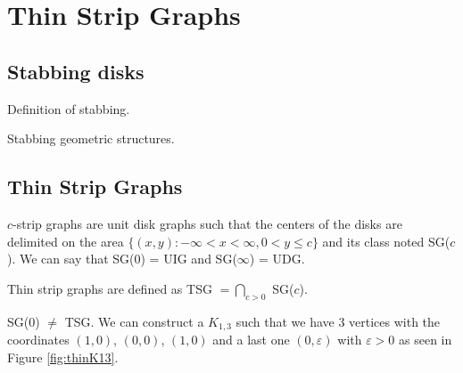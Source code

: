 
\section{Thin Strip Graphs}

\subsection{Stabbing disks}

Definition of stabbing.

Stabbing geometric structures.\cite{schlipf2013stabbing}

\subsection{Thin Strip Graphs}

$c$-strip graphs are unit disk graphs such that the centers of the disks are delimited on the area $\{(x,y) : -\infty < x < \infty, 0 < y \leq c\}$ and its class noted SG($c$). We can say that SG(0) = UIG and SG($\infty$) = UDG. \cite{hayashiThinStripGraphs2017}

\begin{defn}
  Thin strip graphs are defined as TSG $= \bigcap_{c > 0}$ SG($c$).
\end{defn}

\begin{remark}
  SG($0$) $\neq$ TSG. We can construct a $K_{1,3}$ such that we have 3 vertices with the coordinates
  $(1,0)$, $(0,0)$, $(1,0)$ and a last one $(0,\varepsilon)$ with $\varepsilon > 0$ as seen in Figure \ref{fig:thinK13}.
\end{remark}


